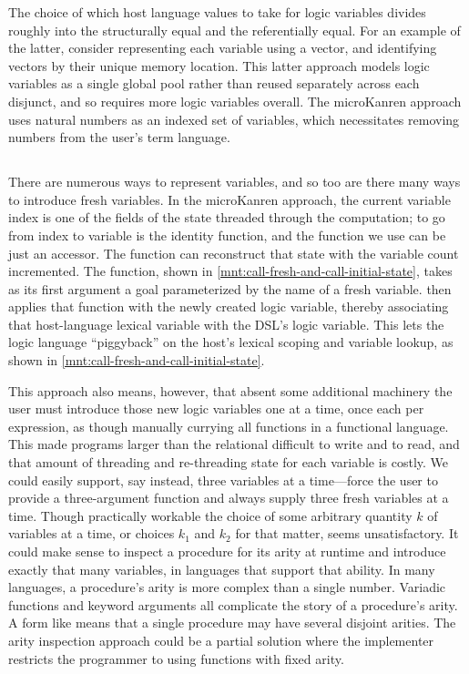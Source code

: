\documentclass[runningheads,natbib=false]{llncs}
\begin{document}
The choice of which host language values to take for logic variables
divides roughly into the structurally equal and the referentially
equal. For an example of the latter, consider representing each
variable using a vector, and identifying vectors by their unique
memory location. This latter approach models logic variables as a
single global pool rather than reused separately across each disjunct,
and so requires more logic variables overall. The microKanren approach
uses natural numbers as an indexed set of variables, which
necessitates removing numbers from the user's term language.

\subsection{}

There are numerous ways to represent variables, and so too are there
many ways to introduce fresh variables. In the microKanren approach,
the current variable index is one of the fields of the state threaded
through the computation; to go from index to variable is the identity
function, and the  function we use can be
just an accessor. The function  can
reconstruct that state with the variable count incremented. The
 function, shown in
\cref{mnt:call-fresh-and-call-initial-state}, takes as its first
argument a goal parameterized by the name of a fresh variable.
 then applies that function with the newly
created logic variable, thereby associating that host-language lexical
variable with the DSL's logic variable. This lets the logic language
\enquote{piggyback} on the host's lexical scoping and variable lookup,
as shown in \cref{mnt:call-fresh-and-call-initial-state}.

This approach also means, however, that absent some additional
machinery the user must introduce those new logic variables one at a
time, once each per  expression, as though
manually currying all functions in a functional language. This made
programs larger than the relational  difficult to
write and to read, and that amount of threading and re-threading state
for each variable is costly. We could easily support, say instead,
three variables at a time---force the user to provide a three-argument
function and always supply three fresh variables at a time. Though
practically workable the choice of some arbitrary quantity $k$ of
variables at a time, or choices $k_{1}$ and $k_{2}$ for that matter,
seems unsatisfactory. It could make sense to inspect a procedure for
its arity at runtime and introduce exactly that many variables, in
languages that support that ability. In many languages, a procedure's
arity is more complex than a single number. Variadic functions and
keyword arguments all complicate the story of a procedure's arity. A
form like  means that a single procedure may
have several disjoint arities. The arity inspection approach could be
a partial solution where the implementer restricts the programmer to
using functions with fixed arity.
\end{document}
